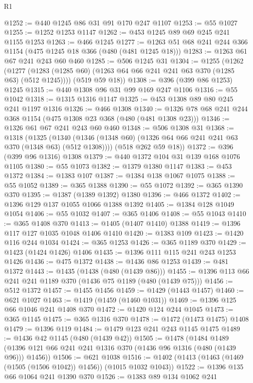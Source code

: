 \begin{lexlean}{R1}
\begin{coremodule}
@1252 := @440 @1245 @86 @31 @91 @170 @247 @1107
@1253 := @55 @1027
@1255 := @1252 @1253 @1147
@1262 := @453 @1245 @89 @69 @245 @241 @1155 @1253
@1263 := @466 @1245
@1277 := @1263 @51 @68 @241 @244 @366 @1154 (@475 @1245 @18 @366 (@480 (@481 @1245 @18)))
@1283 := @1263 @61 @67 @241 @243 @60 @460
@1285 := @506 @1245 @31
@1304 := @1255
    (@1262
      (@1277 (@1283 (@1285 @60) (@1263 @64 @66 @241 @241 @63 @370 (@1285 @63) (@512 @1245))))
      (@519 @59 @18))
@1308 := @396 (@399 @86 @1253) @1245
@1315 := @440 @1308 @96 @31 @99 @169 @247 @1106
@1316 := @55 @1042
@1318 := @1315 @1316 @1147
@1325 := @453 @1308 @89 @80 @245 @241 @1197 @1316
@1326 := @466 @1308
@1340 := @1326 @78 @68 @241 @244 @368 @1154 (@475 @1308 @23 @368 (@480 (@481 @1308 @23)))
@1346 := @1326 @61 @67 @241 @243 @60 @460
@1348 := @506 @1308 @31
@1368 := @1318
    (@1325
      (@1340 (@1346 (@1348 @60) (@1326 @64 @66 @241 @241 @63 @370 (@1348 @63) (@512 @1308))))
      (@518 @262 @59 @18))
@1372 := @396 (@399 @96 @1316) @1308
@1379 := @440 @1372 @104 @31 @139 @168 @1076 @1105
@1380 := @55 @1073
@1382 := @1379 @1380 @1147
@1383 := @453 @1372
@1384 := @1383 @107
@1387 := @1384 @138 @1067 @1075
@1388 := @55 @1052
@1389 := @365 @1388
@1390 := @55 @1072
@1392 := @365 @1390 @370
@1395 := @1387 (@1389 @1392) @1380
@1396 := @466 @1372
@1402 := @1396 @129 @137 @1055 @1066 @1388 @1392
@1405 := @1384 @128 @1049 @1054
@1406 := @55 @1032
@1407 := @365 @1406
@1408 := @55 @1043
@1410 := @365 @1408 @370
@1413 := @1405 (@1407 @1410) @1388
@1419 := @1396 @117 @127 @1035 @1048 @1406 @1410
@1420 := @1383 @109
@1423 := @1420 @116 @244 @1034
@1424 := @365 @1253
@1426 := @365 @1189 @370
@1429 := @1423 (@1424 @1426) @1406
@1435 := @1396 @111 @115 @241 @243 @1253 @1426
@1436 := @475 @1372
@1438 := @1436 @86 @1253
@1439 := @481 @1372
@1443 := @1435 (@1438 (@480 (@1439 @86)))
@1455 := @1396 @113 @66 @241 @241 @1189 @370 (@1436 @75 @1189 (@480 (@1439 @75)))
@1456 := @512 @1372
@1457 := @1455 @1456
@1459 := @1429 (@1443 @1457)
@1460 := @621 @1027
@1463 := @1419 (@1459 (@1460 @1031))
@1469 := @1396 @125 @66 @1046 @241 @1408 @370
@1472 := @1420 @124 @244 @1045
@1473 := @365 @1145
@1475 := @365 @1316 @370
@1478 := @1472 (@1473 @1475) @1408
@1479 := @1396 @119
@1484 := @1479 @123 @241 @243 @1145 @1475
@1489 := @1436 @42 @1145 (@480 (@1439 @42))
@1505 := @1478
    (@1484 @1489 (@1396 @121 @66 @241 @241 @1316 @370 (@1436 @96 @1316 (@480 (@1439 @96))) @1456))
@1506 := @621 @1038
@1516 := @1402 (@1413 (@1463 (@1469 (@1505 (@1506 @1042)) @1456)) (@1015 @1032 @1043))
@1522 := @1396 @135 @66 @1064 @241 @1390 @370
@1526 := @1383 @89 @134 @1062 @241

\end{coremodule}
\end{lexlean}
